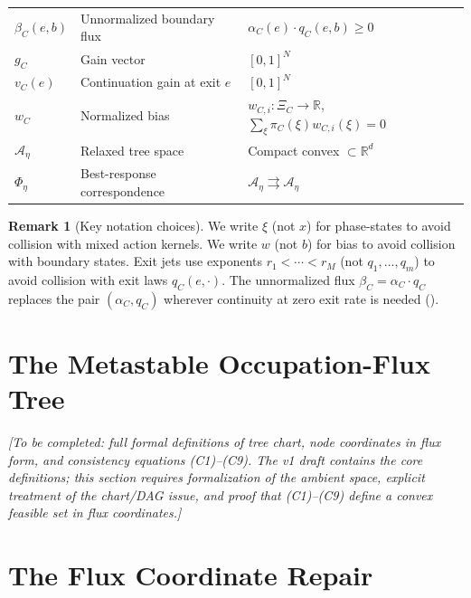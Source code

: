 \documentclass[12pt,a4paper]{article}
\theoremstyle{definition}
\newtheorem{remark}[theorem]{Remark}
\newcommand{\R}{\mathbb{R}}
\begin{document}
\begin{center}
\begin{tabular}{lll}
$\beta_C(e, b)$ & Unnormalized boundary flux & $\alpha_C(e) \cdot q_C(e, b) \geq 0$ \\
$g_C$ & Gain vector & $[0,1]^N$ \\
$v_C(e)$ & Continuation gain at exit $e$ & $[0,1]^N$ \\
$w_C$ & Normalized bias & $w_{C,i} \colon \Xi_C \to \R$, $\sum_\xi \pi_C(\xi) w_{C,i}(\xi) = 0$ \\
\midrule
$\mathcal{A}_\eta$ & Relaxed tree space & Compact convex $\subset \R^d$ \\
$\Phi_\eta$ & Best-response correspondence & $\mathcal{A}_\eta \rightrightarrows \mathcal{A}_\eta$ \\
\bottomrule
\end{tabular}
\end{center}

\begin{remark}[Key notation choices]
\label{rem:notation}
We write $\xi$ (not $x$) for phase-states to avoid collision with mixed action kernels.  We write $w$ (not $b$) for bias to avoid collision with boundary states.  Exit jets use exponents $r_1 < \cdots < r_M$ (not $q_1, \ldots, q_m$) to avoid collision with exit laws $q_C(e, \cdot)$.  The unnormalized flux $\beta_C = \alpha_C \cdot q_C$ replaces the pair $(\alpha_C, q_C)$ wherever continuity at zero exit rate is needed ().
\end{remark}

\section{The Metastable Occupation-Flux Tree}
\label{sec:tree}

\textit{[To be completed: full formal definitions of tree chart, node coordinates in flux form, and consistency equations (C1)--(C9).  The v1 draft contains the core definitions; this section requires formalization of the ambient space, explicit treatment of the chart/DAG issue, and proof that (C1)--(C9) define a convex feasible set in flux coordinates.]}

\section{The Flux Coordinate Repair}
\label{sec:flux}
\end{document}

